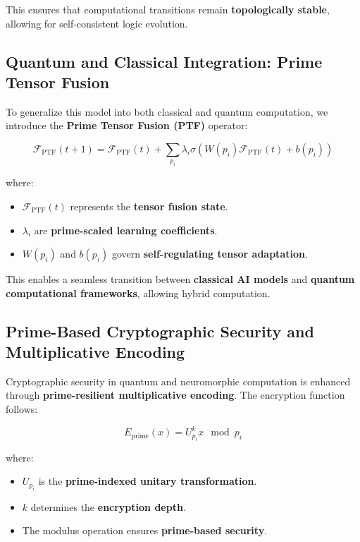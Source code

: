 \documentclass{article}
\theoremstyle{plain}
\theoremstyle{plain}
\theoremstyle{definition}
\theoremstyle{remark}
\begin{document}
This ensures that computational transitions remain \textbf{topologically stable}, allowing for self-consistent logic evolution.

\subsection{Quantum and Classical Integration: Prime Tensor Fusion}

To generalize this model into both classical and quantum computation, we introduce the \textbf{Prime Tensor Fusion (PTF)} operator:

\begin{equation}
\mathcal{F}_{\text{PTF}} (t+1) = \mathcal{F}_{\text{PTF}} (t) + \sum_{p_i} \lambda_i \sigma (W(p_i) \mathcal{F}_{\text{PTF}} (t) + b(p_i))
\end{equation}

where:
\begin{itemize}
    \item $\mathcal{F}_{\text{PTF}} (t)$ represents the \textbf{tensor fusion state}.
    \item $\lambda_i$ are \textbf{prime-scaled learning coefficients}.
    \item $W(p_i)$ and $b(p_i)$ govern \textbf{self-regulating tensor adaptation}.
\end{itemize}

This enables a seamless transition between \textbf{classical AI models} and \textbf{quantum computational frameworks}, allowing hybrid computation.

\subsection{Prime-Based Cryptographic Security and Multiplicative Encoding}

Cryptographic security in quantum and neuromorphic computation is enhanced through \textbf{prime-resilient multiplicative encoding}. The encryption function follows:

\begin{equation}
E_{\text{prime}}(x) = U_{p_i}^k x \mod p_i
\end{equation}

where:
\begin{itemize}
    \item $U_{p_i}$ is the \textbf{prime-indexed unitary transformation}.
    \item $k$ determines the \textbf{encryption depth}.
    \item The modulus operation ensures \textbf{prime-based security}.
\end{itemize}
\end{document}
